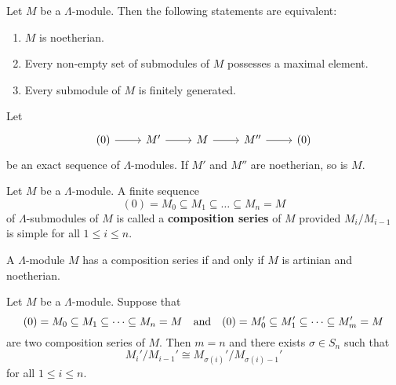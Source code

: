 \begin{proposition}\label{1.1.1}
Let $M$ be a $\Lambda$-module. Then the following statements are equivalent:
\begin{enumerate}
\item $M$ is noetherian.
\item Every non-empty set of submodules of $M$ possesses a maximal element.
\item Every submodule of $M$ is finitely generated.
\end{enumerate}
\end{proposition}


\begin{proposition}\label{1.1.2}
Let
\[
\begin{tikzcd}
	(0) \ar[r] & M' \ar[r] & M \ar[r] & M'' \ar[r] & (0)
\end{tikzcd}
\]
be an exact sequence of $\Lambda$-modules. If $M'$ and $M''$ are noetherian, so is $M$.
\end{proposition}


\begin{definition}
Let $M$ be a $\Lambda$-module. A finite sequence
\[
(0)=M_0\subseteq M_1\subseteq \dots \subseteq M_n = M
\]
of $\Lambda$-submodules of $M$ is called a \textbf{composition series} of $M$ provided $M_i/M_{i-1}$ is simple for all $1\leq i\leq n$.
\end{definition}


\begin{lemma}\label{1.1.3}
A $\Lambda$-module $M$ has a composition series if and only if $M$ is artinian and noetherian.
\end{lemma}


\begin{theorem}\label{1.1.4}
Let $M$ be a $\Lambda$-module.
Suppose that
\[
(0)=M_0\subseteq M_1\subseteq \dots \subseteq M_n = M
\quad\text{and}\quad
(0)=M_0'\subseteq M_1'\subseteq \dots \subseteq M_m' = M
\]
are two composition series of $M$. Then $m=n$ and there exists $\sigma\in S_n$ such that
\[
M_i'/M_{i-1}'\cong M_{\sigma(i)}'/M_{\sigma(i)-1}'
\]
for all $1\leq i\leq n$.
\end{theorem}

